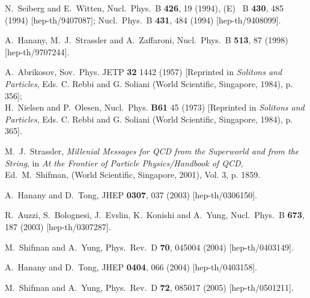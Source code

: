 \documentclass[epsfig,12pt]{article}
\newcommand{\none}{${\cal N}=1\;$}
\begin{document}
\small
\begin{thebibliography}{99}
\itemsep -2pt


N.~Seiberg and E.~Witten,
Nucl.\ Phys.\ B {\bf 426}, 19 (1994),
(E) \ B {\bf 430}, 485 (1994)
[hep-th/9407087];
Nucl.\ Phys.\ B {\bf 431}, 484 (1994)
[hep-th/9408099].

A.~Hanany, M.~J.~Strassler and A.~Zaffaroni,
Nucl.\ Phys.\ B {\bf 513}, 87 (1998)
[hep-th/9707244].

A.~Abrikosov, Sov.~Phys. JETP {\bf32} 1442  (1957)
[Reprinted in {\em Solitons and Particles}, Eds. C. Rebbi and G. Soliani
(World Scientific, Singapore, 1984), p. 356];\\
H.~Nielsen and P.~Olesen, Nucl.~Phys. {\bf B61} 45 (1973)
[Reprinted in {\em Solitons and Particles}, Eds. C. Rebbi and G. Soliani
(World Scientific, Singapore, 1984), p. 365].

M.~J.~Strassler,
{\em Millenial Messages for QCD from the Superworld and from
the String}, in {\sl At the Frontier of Particle Physics/Handbook of QCD},
Ed.~M.~Shifman,
(World Scientific, Singapore, 2001), Vol. 3, p. 1859.

A.~Hanany and D.~Tong,
JHEP {\bf 0307}, 037 (2003)
[hep-th/0306150].

R.~Auzzi, S.~Bolognesi, J.~Evslin, K.~Konishi and A.~Yung,
Nucl.\ Phys.\ B {\bf 673}, 187 (2003)
[hep-th/0307287].

M.~Shifman and A.~Yung,
Phys.\ Rev.\ D {\bf 70}, 045004 (2004)
[hep-th/0403149].

A.~Hanany and D.~Tong,
JHEP {\bf 0404}, 066 (2004)
[hep-th/0403158].

M.~Shifman and A.~Yung,
Phys.\ Rev.\ D {\bf 72}, 085017 (2005)
[hep-th/0501211].


\end{thebibliography}
\end{document}
